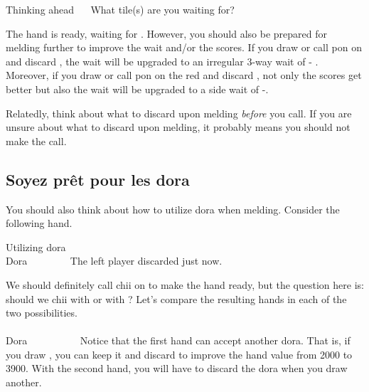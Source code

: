 \begin{itembox}[r]{Thinking ahead}
\bp
{}~~\bai\bai\rbai
\ep
\vspace{-10pt}
What tile(s) are you waiting for?
\end{itembox}
The hand is ready, waiting for {\LARGE{}}. However, you should also be prepared for melding further to improve the wait and/or the scores. 
If you draw or call {\jap pon} on {\LARGE{}} and discard {\LARGE{}}, the wait will be upgraded to an irregular 3-way wait of {\LARGE{}- }. Moreover, if you draw or call {\jap pon} on the red {\LARGE\rfw} and discard {\LARGE{}}, not only the scores get better but also the wait will be upgraded to a side wait of {\LARGE{}-}.

\bigskip
Relatedly, think about what to discard upon melding \emph{before} you call. 
If you are unsure about what to discard upon melding, it probably means you should not make the call. 

\subsection{Soyez prêt pour les {\jap dora}}
You should also think about how to utilize {\jap dora} when melding. Consider the following hand. 

\begin{itembox}[r]{Utilizing {\jap dora}}
\bp
{}~\fa\rfa\fa~~\\
\hfill\footnotesize{{\jap Dora}~~~~~~~~}
\ep
\vspace{-20pt}
The left player discarded {\LARGE{}} just now.
\end{itembox}
\noindent We should definitely call {\jap chii} on {\LARGE{}} to make the hand ready, but the question here is: should we {\jap chii} with {\LARGE{}} or with {\LARGE{}}? Let's compare the resulting hands in each of the two possibilities. 
\bp
{}~~\fa\rfa\fa~\\
~~\fa\rfa\fa~\\
\hfill\footnotesize{{\jap Dora}~~~~~~~~~~}
\ep
Notice that the first hand can accept another {\jap dora}. That is, if you draw {\LARGE{}}, you can keep it and discard {\LARGE{}} to improve the hand value from 2000 to 3900.
With the second hand, you will have to discard the {\jap dora} when you draw another. 

